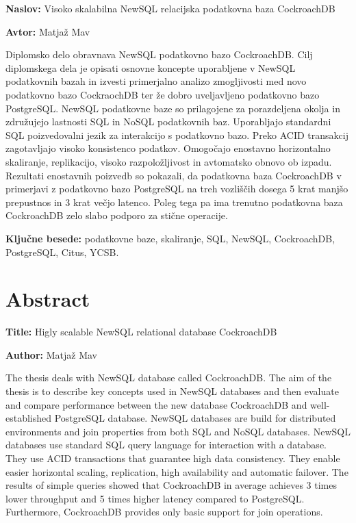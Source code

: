 \documentclass[a4paper, 12pt]{book}
\newcommand{\ttitle}{Visoko skalabilna NewSQL relacijska podatkovna baza CockroachDB}
\newcommand{\ttitleEn}{Higly scalable NewSQL relational database CockroachDB}
\newcommand{\tauthor}{Matjaž Mav}
\newcommand{\tkeywords}{podatkovne baze, skaliranje, SQL, NewSQL, CockroachDB, PostgreSQL, Citus, YCSB}
\newcommand{\clearemptydoublepage}{\newpage{\pagestyle{empty}\cleardoublepage}}
\begin{document}
\noindent\textbf{Naslov:} \ttitle
\bigskip

\noindent\textbf{Avtor:} \tauthor
\bigskip

\noindent Diplomsko delo obravnava NewSQL podatkovno bazo CockroachDB. Cilj diplomskega dela je opisati osnovne koncepte uporabljene v NewSQL podatkovnih bazah in izvesti primerjalno analizo zmogljivosti med novo podatkovno bazo CockraochDB ter že dobro uveljavljeno podatkovno bazo PostgreSQL. NewSQL podatkovne baze so prilagojene za porazdeljena okolja in združujejo lastnosti SQL in NoSQL podatkovnih baz. Uporabljajo standardni SQL poizvedovalni jezik za interakcijo s podatkovno bazo. Preko ACID transakcij zagotavljajo visoko konsistenco podatkov. Omogočajo enostavno horizontalno skaliranje, replikacijo, visoko razpoložljivost in avtomatsko obnovo ob izpadu. Rezultati enostavnih poizvedb so pokazali, da podatkovna baza CockroachDB v primerjavi z podatkovno bazo PostgreSQL na treh vozliščih dosega 5 krat manjšo prepustnos in 3 krat večjo latenco. Poleg tega pa ima trenutno podatkovna baza CockroachDB zelo slabo podporo za stične operacije.
\bigskip

\noindent\textbf{Ključne besede:} \tkeywords.
\clearemptydoublepage

\chapter*{Abstract}

\noindent\textbf{Title:} \ttitleEn
\bigskip

\noindent\textbf{Author:} \tauthor
\bigskip

\noindent The thesis deals with NewSQL database called CockroachDB. The aim of the thesis is to describe key concepts used in NewSQL databases and then evaluate and compare performance between the new database CockroachDB and well-established PostgreSQL database. NewSQL databases are build for distributed environments and join properties from both SQL and NoSQL databases. NewSQL databases use standard SQL query language for interaction with a database. They use ACID transactions that guarantee high data consistency. They enable easier horizontal scaling, replication, high availability and automatic failover. The results of simple queries showed that CockroachDB in average achieves 3 times lower throughput and 5 times higher latency compared to PostgreSQL. Furthermore, CockroachDB provides only basic support for join operations.
\bigskip
\end{document}
